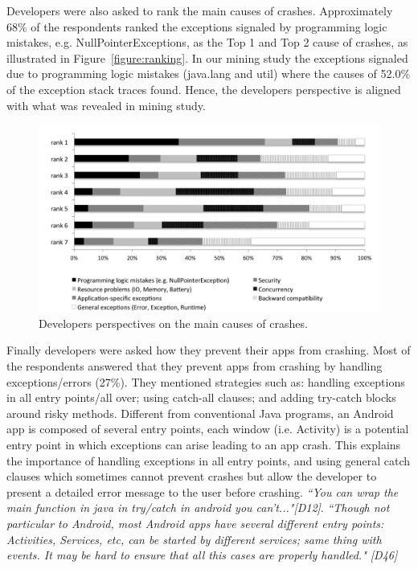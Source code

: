 
Developers were also asked to rank the main causes of crashes. Approximately 68\% of the respondents ranked the exceptions signaled by programming logic mistakes, e.g. NullPointerExceptions, as the Top 1 and Top 2 cause of crashes, as illustrated in Figure~\ref{figure:ranking}. In our mining study the exceptions signaled due to programming logic mistakes (java.lang and util) where the causes of 52.0\% of the exception stack traces found. Hence, the developers perspective is aligned with what was revealed in mining study.
\begin{figure} 
\centering \includegraphics[scale=0.60]{charts/ranking.png}
\caption{Developers perspectives on the main causes of crashes.}\label{fig:ranking} 
\end{figure}


Finally developers were asked how they prevent their apps from crashing. Most of the respondents answered that they prevent apps from crashing by handling exceptions/errors (27\%). They mentioned strategies such as: handling exceptions in all entry points/all over; using catch-all clauses; and adding try-catch blocks around risky methods. Different from conventional Java programs, an Android app is composed of several entry points, each window (i.e. Activity) is a potential entry point in which exceptions can arise leading to an app crash. This explains the importance of handling exceptions in all entry points, and using general catch clauses which sometimes cannot prevent crashes but allow the developer to present a detailed error message to the user before crashing.  \emph{``You can wrap the main function in java in try/catch in android you can't..."[D12]}. \emph{``Though not particular to Android, most Android apps have several different entry points: Activities, Services, etc, can be started by different services; same thing with events. It may be hard to ensure that all this cases are properly handled." [D46]}

